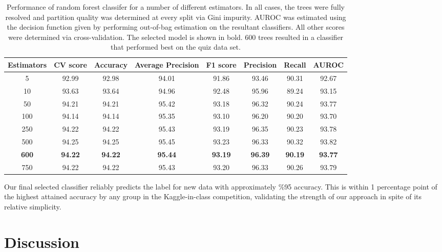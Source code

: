 \documentclass[11pt,a4paper]{article}
\begin{document}
\begin{table}[h]
\begin{center}
\begin{tabular}{c c c c c c c c}
\hline
Estimators & CV score & Accuracy & Average Precision & F1 score & Precision & Recall & AUROC \\
\hline
5 & 92.99 & 92.98 & 94.01 & 91.86 & 93.46 & 90.31 & 92.67 \\
10 & 93.63 & 93.64 & 94.96 & 92.48 & 95.96 & 89.24 & 93.15 \\
50 & 94.21 & 94.21 & 95.42 & 93.18 & 96.32 & 90.24 & 93.77 \\
100 & 94.14 & 94.14 & 95.35 & 93.10 & 96.20 & 90.20 & 93.70 \\
250 & 94.22 & 94.22 & 95.43 & 93.19 & 96.35 & 90.23 & 93.78 \\
500 & 94.25 & 94.25 & 95.45 & 93.23 & 96.33 & 90.32 & 93.82 \\
\textbf{600} & \textbf{94.22} & \textbf{94.22} & \textbf{95.44} & \textbf{93.19} & \textbf{96.39} & \textbf{90.19} & \textbf{93.77} \\
750 & 94.22 & 94.22 & 95.43 & 93.20 & 96.33 & 90.26 & 93.79 \\
\hline
\end{tabular}
\caption{Performance of random forest classifer for a number of different estimators. In all cases, the trees were fully resolved and partition quality was determined at every split via Gini impurity. AUROC was estimated using the decision function given by performing out-of-bag estimation on the resultant classifiers. All other scores were determined via cross-validation. The selected model is shown in bold. 600 trees resulted in a classifier that performed best on the quiz data set.}
\end{center}
\end{table}

Our final selected classifier reliably predicts the label for new data with approximately \%95 accuracy. This is within 1 percentage point of the highest attained accuracy by any group in the Kaggle-in-class competition, validating the strength of our approach in spite of its relative simplicity.

\section{Discussion}
\end{document}
